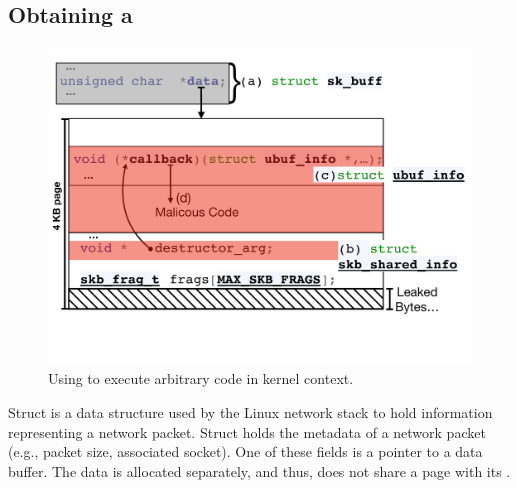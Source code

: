 
\subsection{Obtaining a \DIFdelbegin {}\DIFdelend \DIFaddbegin {}\DIFaddend }\label{sec:shinfo_exploit}
\begin{figure}[t]
    \centering
    \includegraphics[width=0.8\linewidth]{figs/ubuf.pdf}
    \caption{Using \shinfo{} to execute arbitrary code in \DIFaddbeginFL {}\DIFaddendFL kernel context.}
    \label{fig:sh_info}
\end{figure}

Struct \skb{} is a data structure used by the Linux network stack to hold information representing a network packet. Struct \skb{} holds the metadata of a network packet (e.g., packet size, associated socket). One of these fields is a pointer to a data buffer. The data is allocated separately, and thus, does not share a page with its \skb{}\DIFdelbegin {}\DIFdelend \DIFaddbegin {}\DIFaddend . 

